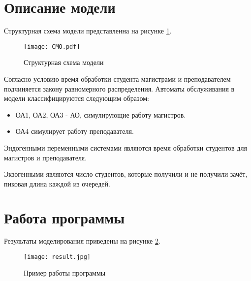 \section{Описание модели}
	Структурная схема модели представленна на рисунке \ref{pic:scheme}.
	
	\begin{figure}[h]
		\begin{center}
			{\texttt{[image: СМО.pdf]}
				\caption{Структурная схема модели}
				\label{pic:scheme}}
		\end{center}
	\end{figure}
	\pagebreak
	Согласно условию время обработки студента магистрами и преподавателем подчиняется закону равномерного распределения. Автоматы обслуживания в модели классифицируются следующим образом:
	\begin{itemize}
		\item ОА1, ОА2, ОА3 - АО, симулирующие работу магистров.
		\item ОА4 симулирует работу преподавателя.
	\end{itemize}

	Эндогенными переменными системами являются время обработки студентов для магистров и преподавателя. 
	
	Экзогенными являются число студентов, которые получили и не получили зачёт, пиковая длина каждой из очередей.


\section{Работа программы}	
	Результаты моделирования приведены на рисунке \ref{pic:res}.
	
	\begin{figure}[h]
		\begin{center}
			{\texttt{[image: result.jpg]}
				\caption{Пример работы программы}
				\label{pic:res}}
		\end{center}
	\end{figure}
	